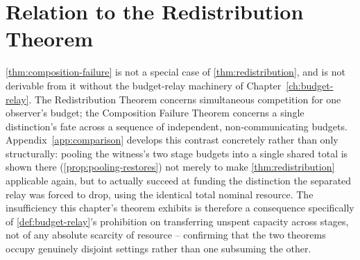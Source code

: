 \section{Relation to the Redistribution Theorem}

\cref{thm:composition-failure} is not a special case of
\cref{thm:redistribution}, and is not derivable from it without the
budget-relay machinery of Chapter~\ref{ch:budget-relay}. The
Redistribution Theorem concerns simultaneous competition for one
observer's budget; the Composition Failure Theorem concerns a single
distinction's fate across a sequence of independent, non-communicating
budgets. Appendix~\ref{app:comparison} develops this contrast concretely
rather than only structurally: pooling the witness's two stage budgets
into a single shared total is shown there
(\cref{prop:pooling-restores}) not merely to make
\cref{thm:redistribution} applicable again, but to actually succeed at
funding the distinction the separated relay was forced to drop, using
the identical total nominal resource. The insufficiency this chapter's
theorem exhibits is therefore a consequence specifically of
\cref{def:budget-relay}'s prohibition on transferring unspent capacity
across stages, not of any absolute scarcity of resource -- confirming
that the two theorems occupy genuinely disjoint settings rather than one
subsuming the other.
